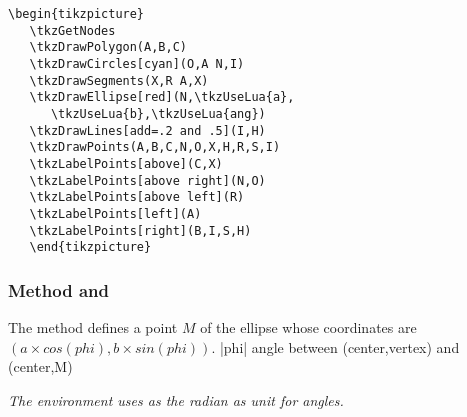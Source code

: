 \begin{Verbatim}
\begin{tikzpicture}
   \tkzGetNodes
   \tkzDrawPolygon(A,B,C)
   \tkzDrawCircles[cyan](O,A N,I)
   \tkzDrawSegments(X,R A,X)
   \tkzDrawEllipse[red](N,\tkzUseLua{a},
      \tkzUseLua{b},\tkzUseLua{ang})
   \tkzDrawLines[add=.2 and .5](I,H)
   \tkzDrawPoints(A,B,C,N,O,X,H,R,S,I)
   \tkzLabelPoints[above](C,X)
   \tkzLabelPoints[above right](N,O)
   \tkzLabelPoints[above left](R)
   \tkzLabelPoints[left](A)
   \tkzLabelPoints[right](B,I,S,H)
   \end{tikzpicture}
  \end{Verbatim}

\subsubsection{Method  and } %
\label{ssub:ellipse_method_point}
 The method  defines a point $M$ of the ellipse whose coordinates are $(a\times  cos(phi), b\times sin(phi))$. |phi| angle between (center,vertex) and (center,M)

 \emph{The environment  uses as  the radian as unit for angles. }


